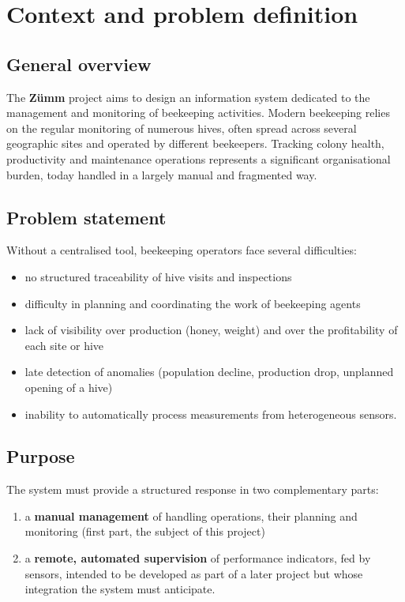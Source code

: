 \chapter{Context and problem definition}

\section{General overview}
The \textbf{Zümm} project aims to design an information system dedicated to the
management and monitoring of beekeeping activities. Modern beekeeping relies on
the regular monitoring of numerous hives, often spread across several
geographic sites and operated by different beekeepers. Tracking colony health,
productivity and maintenance operations represents a significant organisational
burden, today handled in a largely manual and fragmented way.

\section{Problem statement}
Without a centralised tool, beekeeping operators face several difficulties:
\begin{itemize}
  \item no structured traceability of hive visits and inspections
  \item difficulty in planning and coordinating the work of beekeeping agents
  \item lack of visibility over production (honey, weight) and over the profitability of each site or hive
  \item late detection of anomalies (population decline, production drop, unplanned opening of a hive)
  \item inability to automatically process measurements from heterogeneous sensors.
\end{itemize}

\section{Purpose}
The system must provide a structured response in two complementary parts:
\begin{enumerate}
  \item a \textbf{manual management} of handling operations, their planning and
        monitoring (first part, the subject of this project)
  \item a \textbf{remote, automated supervision} of performance indicators,
        fed by sensors, intended to be developed as part of a later project but
        whose integration the system must anticipate.
\end{enumerate}
